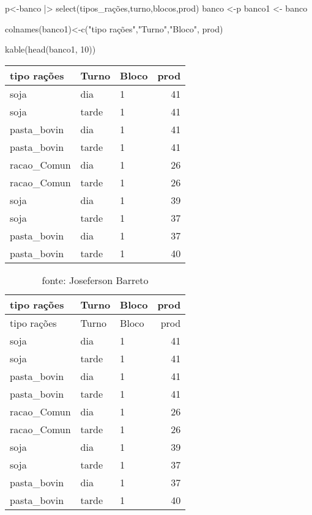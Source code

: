 \documentclass[
  letterpaper,
  DIV=11,
  numbers=noendperiod]{scrartcl}
\newenvironment{Shaded}{\begin{snugshade}}{\end{snugshade}}
\newcommand{\DecValTok}[1]{\textcolor[rgb]{0.68,0.00,0.00}{#1}}
\newcommand{\FunctionTok}[1]{\textcolor[rgb]{0.28,0.35,0.67}{#1}}
\newcommand{\NormalTok}[1]{\textcolor[rgb]{0.00,0.23,0.31}{#1}}
\newcommand{\OtherTok}[1]{\textcolor[rgb]{0.00,0.23,0.31}{#1}}
\newcommand{\SpecialCharTok}[1]{\textcolor[rgb]{0.37,0.37,0.37}{#1}}
\newcommand{\StringTok}[1]{\textcolor[rgb]{0.13,0.47,0.30}{#1}}
\begin{document}
\begin{Shaded}
\begin{Highlighting}[]
\NormalTok{p}\OtherTok{\textless{}{-}}\NormalTok{banco }\SpecialCharTok{|\textgreater{}} \FunctionTok{select}\NormalTok{(tipos\_rações,turno,blocos,prod) }
\NormalTok{banco }\OtherTok{\textless{}{-}}\NormalTok{p}
\NormalTok{banco1 }\OtherTok{\textless{}{-}}\NormalTok{ banco}

\FunctionTok{colnames}\NormalTok{(banco1)}\OtherTok{\textless{}{-}}\FunctionTok{c}\NormalTok{(}\StringTok{"tipo rações"}\NormalTok{,}\StringTok{"Turno"}\NormalTok{,}\StringTok{"Bloco"}\NormalTok{, }\StringTok{\textquotesingle{}prod\textquotesingle{}}\NormalTok{)}

\FunctionTok{kable}\NormalTok{(}\FunctionTok{head}\NormalTok{(banco1, }\DecValTok{10}\NormalTok{))}
\end{Highlighting}
\end{Shaded}

\begin{longtable}[]{@{}lllr@{}}
\toprule\noalign{}
tipo rações & Turno & Bloco & prod \\
\midrule\noalign{}
\endhead
\bottomrule\noalign{}
\endlastfoot
soja & dia & 1 & 41 \\
soja & tarde & 1 & 41 \\
pasta\_bovin & dia & 1 & 41 \\
pasta\_bovin & tarde & 1 & 41 \\
racao\_Comun & dia & 1 & 26 \\
racao\_Comun & tarde & 1 & 26 \\
soja & dia & 1 & 39 \\
soja & tarde & 1 & 37 \\
pasta\_bovin & dia & 1 & 37 \\
pasta\_bovin & tarde & 1 & 40 \\
\end{longtable}

\begin{longtable}[]{@{}lllr@{}}
\caption{fonte: Joseferson Barreto}\tabularnewline
\toprule\noalign{}
tipo rações & Turno & Bloco & prod \\
\midrule\noalign{}
\endfirsthead
\toprule\noalign{}
tipo rações & Turno & Bloco & prod \\
\midrule\noalign{}
\endhead
\bottomrule\noalign{}
\endlastfoot
soja & dia & 1 & 41 \\
soja & tarde & 1 & 41 \\
pasta\_bovin & dia & 1 & 41 \\
pasta\_bovin & tarde & 1 & 41 \\
racao\_Comun & dia & 1 & 26 \\
racao\_Comun & tarde & 1 & 26 \\
soja & dia & 1 & 39 \\
soja & tarde & 1 & 37 \\
pasta\_bovin & dia & 1 & 37 \\
pasta\_bovin & tarde & 1 & 40 \\
\end{longtable}
\end{document}
